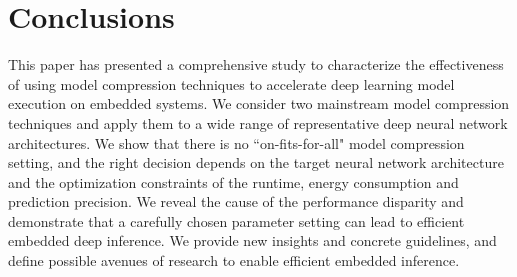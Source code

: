 \section{Conclusions}
This paper has presented a comprehensive study to characterize the effectiveness of using model compression techniques to accelerate deep
learning model execution on embedded systems. We consider two mainstream model compression techniques and apply them to a wide range of
representative deep neural network architectures. We show that there is no ``on-fits-for-all" model compression setting, and the right
decision depends on the target neural network architecture and the optimization constraints of the runtime, energy consumption and
prediction precision. We reveal the cause of the performance disparity and demonstrate that a carefully chosen parameter setting can lead
to efficient embedded deep inference. We provide new insights and concrete guidelines, and define possible avenues of research to enable
efficient embedded inference.
